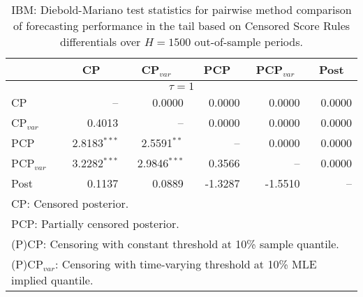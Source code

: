 { \renewcommand{\arraystretch}{1.2} 
\begin{table} 
\center 
\begin{tabular}{l | rrrrr} 
& \multicolumn{1}{c}{CP}& \multicolumn{1}{c}{CP$_{var}$}& \multicolumn{1}{c}{PCP}& \multicolumn{1}{c}{PCP$_{var}$}& \multicolumn{1}{c}{Post} \\ \hline 
\multicolumn{6}{c}{$\tau = 1$} \\ \hline 
CP &    --\phantom{$^{***}$} & 0.0000\phantom{$^{***}$} & 0.0000\phantom{$^{***}$} & 0.0000\phantom{$^{***}$} & 0.0000\phantom{$^{***}$}   \\ 
CP$_{var}$ & 0.4013\phantom{$^{***}$} &    --\phantom{$^{***}$} & 0.0000\phantom{$^{***}$} & 0.0000\phantom{$^{***}$} & 0.0000\phantom{$^{***}$}   \\ 
PCP & 2.8183$^{***}$ & 2.5591$^{**}$\phantom{$^{*}$} &    --\phantom{$^{***}$} & 0.0000\phantom{$^{***}$} & 0.0000\phantom{$^{***}$}   \\ 
PCP$_{var}$ & 3.2282$^{***}$ & 2.9846$^{***}$ & 0.3566\phantom{$^{***}$} &    --\phantom{$^{***}$} & 0.0000\phantom{$^{***}$}   \\ 
Post & 0.1137\phantom{$^{***}$} & 0.0889\phantom{$^{***}$} & -1.3287\phantom{$^{***}$} & -1.5510\phantom{$^{***}$} &    --\phantom{$^{***}$}   \\ 
\hline 
\multicolumn{6}{l}{\footnotesize{CP: Censored posterior.}}  \\ 
\multicolumn{6}{l}{\footnotesize{PCP: Partially censored posterior.}} \\ 
\multicolumn{6}{l}{\footnotesize{(P)CP: Censoring with constant threshold at 10\% sample quantile.}}  \\ 
\multicolumn{6}{l}{\footnotesize{(P)CP$_{var}$: Censoring with time-varying threshold at 10\% MLE implied quantile.}} \\ 
\end{tabular}
 \caption{IBM: Diebold-Mariano test statistics for  pairwise method comparison of forecasting performance in the tail based on  Censored Score Rules differentials over $H=1500$ out-of-sample periods. }
\label{tab:IBM_DMv_1}  
\end{table}
}